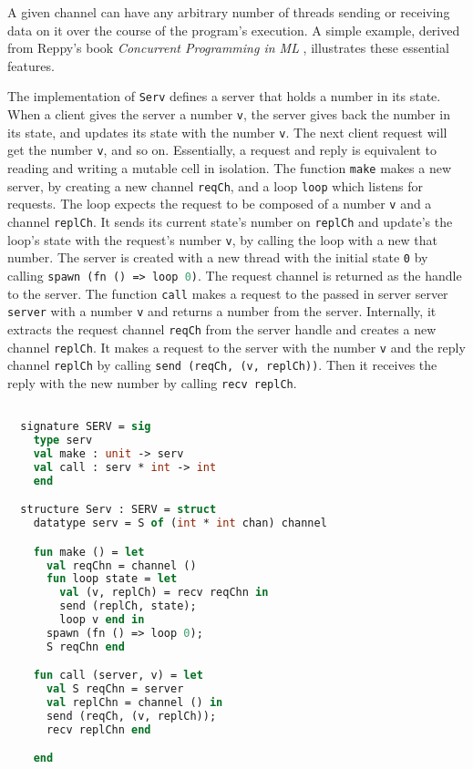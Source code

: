 \documentclass{article}
\begin{document}
A given channel can have any arbitrary number of threads sending or receiving data on it over
the course of the program's execution. A simple example, derived from Reppy's book
\textit{Concurrent Programming in ML} \cite{concurrent_ml}, illustrates these essential
features.

The implementation of \lstinline{Serv} defines a server that holds a number in its state.
When a client gives the server a number \lstinline{v}, the server gives back the number in
its state, and updates its state with the number \lstinline{v}.  The next client request will
get the number \lstinline{v}, and so on. Essentially, a request and reply is equivalent
to reading and writing a mutable cell in isolation. The function \lstinline{make} makes a new
server, by creating a new channel \lstinline{reqCh}, and a loop \lstinline{loop} which listens
for requests. The loop expects the request to be composed of a number \lstinline{v} and a
channel \lstinline{replCh}. It sends its current state's number on \lstinline{replCh} and
update's the loop's state with the request's number \lstinline{v}, by calling the loop with a
new that number. The server is created with a new thread with the initial state \lstinline{0}
by calling \lstinline[language=ML]{spawn (fn () => loop 0)}. The request channel is returned
as the handle to the server.  The function \lstinline{call} makes a request to the passed in
server server \lstinline{server} with a number \lstinline{v} and returns a number from the
server. Internally, it extracts the request channel \lstinline{reqCh} from the
server handle and creates a new channel \lstinline{replCh}. It makes a request to the server
with the number \lstinline{v} and the reply channel \lstinline{replCh} by calling
\lstinline{send (reqCh, (v, replCh))}. Then it receives the reply with the new number by
calling \lstinline{recv replCh}.


\begin{lstlisting}[language=ML, escapechar=\%]

  signature SERV = sig 
    type serv
    val make : unit -> serv
    val call : serv * int -> int
    end

  structure Serv : SERV = struct 
    datatype serv = S of (int * int chan) channel 

    fun make () = let 
      val reqChn = channel ()
      fun loop state = let
        val (v, replCh) = recv reqChn in 
        send (replCh, state);
        loop v end in
      spawn (fn () => loop 0);
      S reqChn end 

    fun call (server, v) = let 
      val S reqChn = server
      val replChn = channel () in 
      send (reqCh, (v, replCh));
      recv replChn end

    end

  \end{lstlisting}
\end{document}
